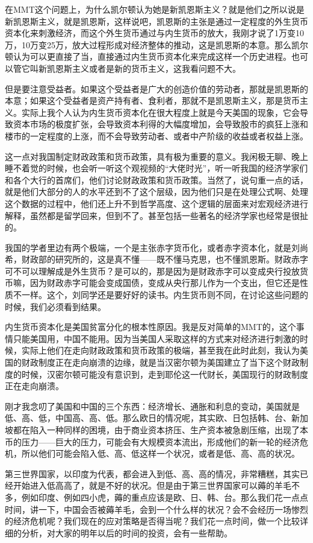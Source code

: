 \documentclass[UTF8, 12pt, a4paper]{ctexrep}
\begin{document}
在MMT这个问题上，为什么凯尔顿认为她是新凯恩斯主义？就是他们之所以说是新凯恩斯主义，就是凯恩斯，这样说吧，凯恩斯的主张是通过一定程度的外生货币资本化来刺激经济，而这个外生货币通过与内生货币的放大，我刚才说了1万变10万，10万变25万，放大过程形成对经济整体的推动，这是凯恩斯的本意。那么凯尔顿认为可以更直接了当，直接通过内生货币资本化来完成这样一个历史进程。也可以管它叫新凯恩斯主义或者是新的货币主义，这我看问题不大。

但是要注意受益者。如果这个受益者是广大的创造价值的劳动者，那就是凯恩斯的本意；如果这个受益者是资产持有者、食利者，那就不是凯恩斯主义，那是货币主义。实际上我个人认为内生货币资本化在很大程度上就是今天美国的现象，它会导致资本市场的极度扩张，会导致资本利得的大幅度增加，会导致股市的疯狂上涨和楼市的一定程度的上涨，而不会导致劳动者、或者中产阶级的收益或者权益上涨。

这一点对我国制定财政政策和货币政策，具有极为重要的意义。我闲极无聊、晚上睡不着觉的时候，也会听一听这个观视频的“大佬时光”，听一听我国的经济学家们和各个大行的首席们，他们讨论财政政策和货币政策。当然了，说句重一点的话，就是他们大部分的人的水平还到不了这个层级，因为他们只是在处理公式啊、处理这个数据的过程中，他们还上升不到哲学高度、这个逻辑的层面来对宏观经济进行解释，虽然都是留学回来，但到不了。甚至包括一些著名的经济学家也经常是很扯的。

我国的学者里边有两个极端，一个是主张赤字货币化，或者赤字资本化，就是刘尚希，财政部的研究所的，这是真不懂——既不懂马克思，也不懂凯恩斯。财政赤字可不可以理解成是外生货币？是可以的，那是因为是财政赤字可以变成央行投放货币嘛，因为财政赤字可能会变成国债，变成从央行那儿作为一个支出，但它还是性质不一样。这个，刘同学还是要好好的读书。内生货币则不同，在讨论这些问题的时候，我们必须看到结果。

内生货币资本化是美国贫富分化的根本性原因。我是反对简单的MMT的，这个事情只能美国用，中国不能用。因为当美国人采取这样的方式来对经济进行刺激的时候，实际上他们在走向财政政策和货币政策的极端，甚至我在此时此刻，我认为美国的财政制度正在走向崩溃的边缘，就是当汉密尔顿为美国建立了当下这个财政制度的时候，汉密尔顿可能没有意识到，走到耶伦这一代财长，美国现行的财政制度正在走向崩溃。

刚才我念叨了美国和中国的三个东西：经济增长、通胀和利息的变动，美国就是低、高、低，中国高、高、低。那么欧日的情况呢，其实欧、日包括韩、台、新加坡都在陷入一种同样的困境，由于商业资本挤压、生产资本被急剧压缩，出现了本币的压力——巨大的压力，可能会有大规模资本流出，形成他们的新一轮的经济危机，所以他们可能会陷入低、高、低这样一个状况，或者是低、高、高的状况。

第三世界国家，以印度为代表，都会进入到低、高、高的情况，非常糟糕，其实已经开始进入低高高了，就是不好的状况。但是由于第三世界国家可以薅的羊毛不多，例如印度、例如四小虎，薅的重点应该是欧、日、韩、台。那么我们花一点点时间，讲一下，中国会否被薅羊毛，会到一个什么样的状况？会不会经历一场惨烈的经济危机呢？我们现在的应对策略是否得当呢？我们花一点时间，做一个比较详细的分析，对大家的明年以后的时间的投资，会有一些帮助。
\end{document}

